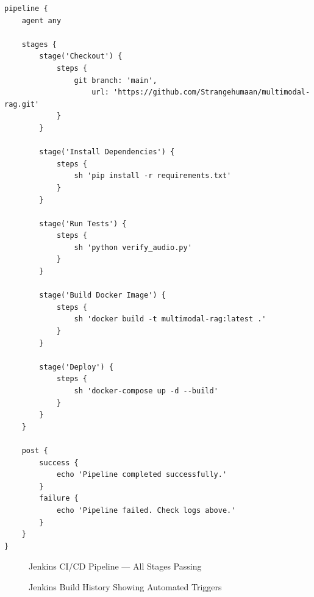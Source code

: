 \documentclass[12pt,a4paper]{report}
\begin{document}
\begin{lstlisting}[caption=Jenkinsfile Pipeline Definition]
pipeline {
    agent any

    stages {
        stage('Checkout') {
            steps {
                git branch: 'main',
                    url: 'https://github.com/Strangehumaan/multimodal-rag.git'
            }
        }

        stage('Install Dependencies') {
            steps {
                sh 'pip install -r requirements.txt'
            }
        }

        stage('Run Tests') {
            steps {
                sh 'python verify_audio.py'
            }
        }

        stage('Build Docker Image') {
            steps {
                sh 'docker build -t multimodal-rag:latest .'
            }
        }

        stage('Deploy') {
            steps {
                sh 'docker-compose up -d --build'
            }
        }
    }

    post {
        success {
            echo 'Pipeline completed successfully.'
        }
        failure {
            echo 'Pipeline failed. Check logs above.'
        }
    }
}
\end{lstlisting}

\begin{figure}[H]
    \centering
    \caption{Jenkins CI/CD Pipeline --- All Stages Passing}
    \label{fig:jenkins_pipeline}
\end{figure}

\begin{figure}[H]
    \centering
    \caption{Jenkins Build History Showing Automated Triggers}
    \label{fig:jenkins_history}
\end{figure}
\end{document}
